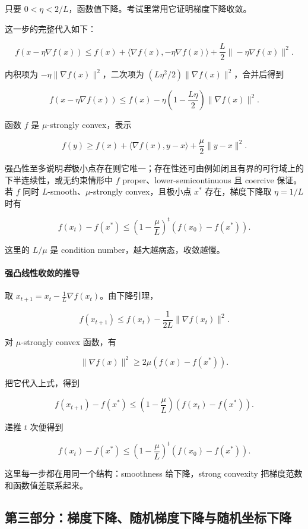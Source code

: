 只要 \(0<\eta<2/L\)，函数值下降。考试里常用它证明梯度下降收敛。

这一步的完整代入如下：

\[
  f(x-\eta\nabla f(x))
  \le
  f(x)
  +
  \langle\nabla f(x),-\eta\nabla f(x)\rangle
  +
  \frac{L}{2}\|-\eta\nabla f(x)\|^2.
\]

内积项为 \(-\eta\|\nabla f(x)\|^2\)，二次项为 \((L\eta^2/2)\|\nabla f(x)\|^2\)，合并后得到

\[
  f(x-\eta\nabla f(x))
  \le
  f(x)
  -
  \eta\left(1-\frac{L\eta}{2}\right)\|\nabla f(x)\|^2.
\]

函数 \(f\) 是 \(\mu\)-strongly convex，表示

\[
  f(y)\ge
  f(x)+\langle\nabla f(x),y-x\rangle
  +\frac{\mu}{2}\|y-x\|^2.
\]

强凸性至多说明\emph{若}极小点存在则它唯一；存在性还可由例如闭且有界的可行域上的下半连续性，或无约束情形中 \(f\) proper、lower-semicontinuous 且 coercive 保证。若 \(f\) 同时 \(L\)-smooth、\(\mu\)-strongly convex，且极小点 \(x^*\) 存在，梯度下降取 \(\eta=1/L\) 时有

\[
  f(x_t)-f(x^*)
  \le
  \left(1-\frac{\mu}{L}\right)^t
  \left(f(x_0)-f(x^*)\right).
\]

这里的 \(L/\mu\) 是 condition number，越大越病态，收敛越慢。

\paragraph{强凸线性收敛的推导}

取 \(x_{t+1}=x_t-\frac1L\nabla f(x_t)\)。由下降引理，

\[
  f(x_{t+1})
  \le
  f(x_t)
  -
  \frac{1}{2L}\|\nabla f(x_t)\|^2.
\]

对 \(\mu\)-strongly convex 函数，有

\[
  \|\nabla f(x)\|^2
  \ge
  2\mu(f(x)-f(x^*)).
\]

把它代入上式，得到

\[
  f(x_{t+1})-f(x^*)
  \le
  \left(1-\frac{\mu}{L}\right)
  (f(x_t)-f(x^*)).
\]

递推 \(t\) 次便得到

\[
  f(x_t)-f(x^*)
  \le
  \left(1-\frac{\mu}{L}\right)^t
  (f(x_0)-f(x^*)).
\]

这里每一步都在用同一个结构：smoothness 给下降，strong convexity 把梯度范数和函数值差联系起来。

\subsection{第三部分：梯度下降、随机梯度下降与随机坐标下降}

